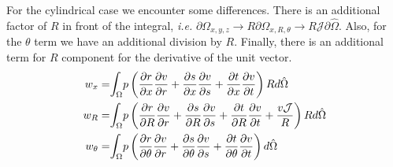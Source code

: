 \documentclass{kthreport}
\begin{document}
For the cylindrical case we encounter some differences. There is an additional factor of $R$ in front of the integral, \textit{i.e.} $\partial \Omega_{x,y,z} \rightarrow R\partial \Omega_{x,R,\theta} \rightarrow R\mathcal{J}\partial \hat{\Omega}$. Also, for the $\theta$ term we have an additional division by $R$. Finally, there is an additional term for $R$ component for the derivative of the unit vector.
\begin{eqnarray}
	w_{x} =& \mathlarger\int_{\Omega} p\left(\dfrac{\partial r}{\partial x}\dfrac{\partial v}{\partial r} + \dfrac{\partial s}{\partial x}\dfrac{\partial v}{\partial s} + \dfrac{\partial t}{\partial x}\dfrac{\partial v}{\partial t}\right) R d\hat{\Omega} \nonumber \\
	w_{R} =& \mathlarger\int_{\Omega} p\left(\dfrac{\partial r}{\partial R}\dfrac{\partial v}{\partial r} + \dfrac{\partial s}{\partial R}\dfrac{\partial v}{\partial s} + \dfrac{\partial t}{\partial R}\dfrac{\partial v}{\partial t} + \dfrac{v\mathcal{J}}{R} \right) R d\hat{\Omega} \nonumber \\
	w_{\theta} =& \mathlarger\int_{\Omega} p\left(\dfrac{\partial r}{\partial \theta}\dfrac{\partial v}{\partial r} + \dfrac{\partial s}{\partial \theta}\dfrac{\partial v}{\partial s} + \dfrac{\partial t}{\partial \theta}\dfrac{\partial v}{\partial t}\right) d\hat{\Omega} \nonumber
\end{eqnarray}
\end{document}
